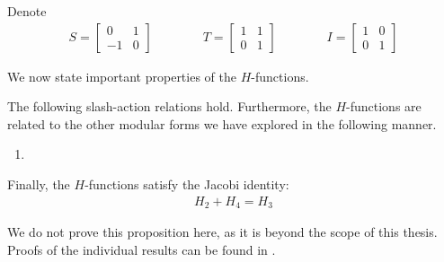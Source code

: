 \begin{boxnotation}
    Denote
    \begin{align*}
        S = \begin{bmatrix}
            0 & 1 \\ -1 & 0
        \end{bmatrix}
        \qquad \qquad
        T = \begin{bmatrix}
            1 & 1 \\ 0 & 1
        \end{bmatrix}
        \qquad \qquad
        I = \begin{bmatrix}
            1 & 0 \\ 0 & 1
        \end{bmatrix}
    \end{align*}
\end{boxnotation}

We now state important properties of the $H$-functions.

\begin{boxproposition}\label{Ch2:Prop:H_Rels}
    The following slash-action relations hold.
    Furthermore, the $H$-functions are related to the other modular forms we have explored in the following manner.
    \begin{enumerate}
        \item 
    \end{enumerate}
    Finally, the $H$-functions satisfy the Jacobi identity:
    \begin{align*}
        H_2 + H_4 = H_3
    \end{align*}
\end{boxproposition}

We do not prove this proposition here, as it is beyond the scope of this thesis. Proofs of the individual results can be found in \cite{blueprint}.

